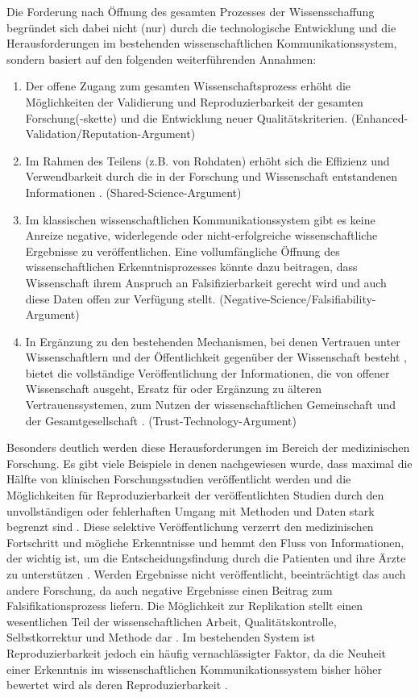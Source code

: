 Die Forderung nach Öffnung des gesamten Prozesses der Wissensschaffung begründet sich dabei nicht (nur) durch die technologische Entwicklung und die Herausforderungen im bestehenden wissenschaftlichen Kommunikationssystem, sondern basiert auf den folgenden weiterführenden Annahmen:
\begin{enumerate}
\item Der offene Zugang zum gesamten Wissenschaftsprozess erhöht die Möglichkeiten der Validierung und Reproduzierbarkeit der gesamten Forschung(-skette) \cite{Nosek_2015} \cite{Aleksic_2014} \cite{Krumholz_2014} \cite{Hey_2015} und die Entwicklung neuer Qualitätskriterien. (Enhanced-Validation/Reputation-Argument)
\item Im Rahmen des Teilens (z.B. von Rohdaten) erhöht sich die Effizienz und Verwendbarkeit durch die in der Forschung und Wissenschaft entstandenen Informationen \cite{Fecher_2015}. (Shared-Science-Argument)
\item Im klassischen wissenschaftlichen Kommunikationssystem gibt es keine Anreize negative, widerlegende oder nicht-erfolgreiche wissenschaftliche Ergebnisse zu veröffentlichen. Eine vollumfängliche Öffnung des wissenschaftlichen Erkenntnisprozesses könnte dazu beitragen, dass Wissenschaft ihrem Anspruch an Falsifizierbarkeit gerecht wird und auch diese Daten offen zur Verfügung stellt. (Negative-Science/Falsifiability-Argument)
\item In Ergänzung zu den bestehenden Mechanismen, bei denen Vertrauen unter Wissenschaftlern und der Öffentlichkeit gegenüber der Wissenschaft besteht \cite{Weingart_2005}, bietet die vollständige Veröffentlichung der Informationen, die von offener Wissenschaft ausgeht, Ersatz für oder Ergänzung zu älteren Vertrauenssystemen, zum Nutzen der wissenschaftlichen Gemeinschaft und der Gesamtgesellschaft \cite{Grand_2012}. (Trust-Technology-Argument)
\end{enumerate}

Besonders deutlich werden diese Herausforderungen im Bereich der medizinischen Forschung. Es gibt viele Beispiele in denen nachgewiesen wurde, dass maximal die Hälfte von klinischen Forschungsstudien veröffentlicht werden \cite[:86]{Chalmers_2009} und die Möglichkeiten für Reproduzierbarkeit der veröffentlichten Studien durch den unvollständigen oder fehlerhaften Umgang mit Methoden und Daten stark begrenzt sind \cite{Dechartres_2015} \cite{Chan_2014}. Diese selektive Veröffentlichung verzerrt den medizinischen Fortschritt und mögliche Erkenntnisse und hemmt den Fluss von Informationen, der wichtig ist, um die Entscheidungsfindung durch die Patienten und ihre Ärzte zu unterstützen \cite{Ross_2013}. Werden Ergebnisse nicht veröffentlicht, beeinträchtigt das auch andere Forschung, da auch negative Ergebnisse einen Beitrag zum Falsifikationsprozess liefern. Die Möglichkeit zur Replikation stellt einen wesentlichen Teil der wissenschaftlichen Arbeit, Qualitätskontrolle, Selbstkorrektur und Methode dar \cite{Nosek_2015}. Im bestehenden System ist Reproduzierbarkeit jedoch ein häufig vernachlässigter Faktor, da die Neuheit einer Erkenntnis im wissenschaftlichen Kommunikationssystem bisher höher bewertet wird als deren Reproduzierbarkeit \cite{Nosek_2015}.

